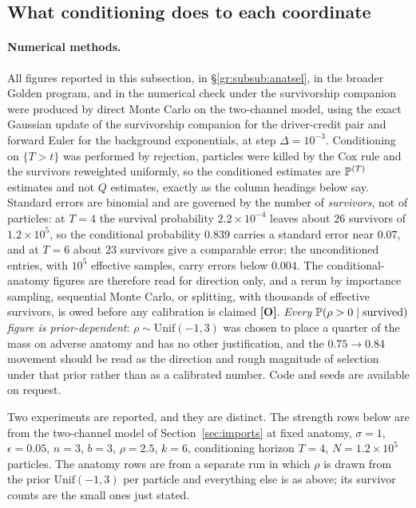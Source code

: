 \subsection{What conditioning does to each coordinate}
\label{gr:subsub:measured}

\paragraph{Numerical methods.} All figures reported in this subsection,
in \S\ref{gr:subsub:anatsel}, in the broader Golden program, and in
the numerical check under the survivorship companion \cite{GoldenSurvivorship} were
produced by direct Monte Carlo on the two-channel model, using the exact
Gaussian update of the survivorship companion \cite{GoldenSurvivorship} for the driver-credit pair
and forward Euler for the background exponentials, at step
$\Delta=10^{-3}$. Conditioning on $\{T>t\}$ was performed by rejection, particles were killed by the Cox rule and the survivors reweighted
uniformly, so the conditioned estimates are $\mathbb{P}^{(T)}$ estimates and
not $Q$ estimates, exactly as the column headings below say. Standard errors are binomial and are governed by the number of
\emph{survivors}, not of particles: at $T=4$ the survival probability
$2.2\times10^{-4}$ leaves about $26$ survivors of $1.2\times10^{5}$, so
the conditional probability $0.839$ carries a standard error near
$0.07$, and at $T=6$ about $23$ survivors give a comparable error; the
unconditioned entries, with $10^5$ effective samples, carry errors
below $0.004$. The conditional-anatomy figures are therefore read for
direction only, and a rerun by importance sampling, sequential Monte
Carlo, or splitting, with thousands of effective survivors, is owed
before any calibration is claimed \textbf{[O]}. \emph{Every $\mathbb{P}(\rho>0\mid\text{survived})$
figure is prior-dependent}: $\rho\sim\mathrm{Unif}(-1,3)$ was chosen to
place a quarter of the mass on adverse anatomy and has no other
justification, and the $0.75\to0.84$ movement should be read as the
direction and rough magnitude of selection under that prior rather than
as a calibrated number. Code and seeds are available on request.

Two experiments are reported, and they are distinct. The strength rows
below are from the two-channel model of Section~\ref{sec:imports} at fixed
anatomy, $\sigma=1$, $\epsilon=0.05$, $n=3$, $b=3$, $\rho=2.5$, $k=6$,
conditioning horizon $T=4$, $N=1.2\times10^{5}$ particles. The anatomy
rows are from a separate run in which $\rho$ is drawn from the prior
$\mathrm{Unif}(-1,3)$ per particle and everything else is as above; its
survivor counts are the small ones just stated.

